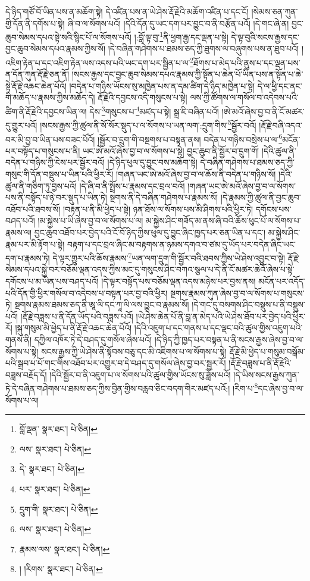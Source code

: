 དེ་ཉིད་གཙོ་བོ་ཡིན་པས་ན་མཆོག་སྟེ། དེ་འཛིན་པས་ན་ཡེ་ཤེས་རྡོ་རྗེའི་མཆོག་འཛིན་པ་དང་ངོ། །སེམས་ཅན་ཀུན་གྱི་དོན་ནི་དགོས་པ་སྟེ། ཞི་བ་ལ་སོགས་པའོ། །དེའི་དོན་དུ་ཡང་དག་པར་བྱུང་བ་ནི་བརྩོན་པའོ། །དེ་གང་ཞེ་ན། བྱང་ཆུབ་སེམས་དཔའ་སྟེ་སའི་སྙིང་པོ་ལ་སོགས་པའོ། །:བློ་ལྟ་བུ་\footnote{བློ་ལྡན་  སྣར་ཐང་།  པེ་ཅིན། }ནི་ཕྱག་རྒྱ་དང་ལྡན་པ་སྟེ། དེ་ལྟ་བུའི་སངས་རྒྱས་དང་བྱང་ཆུབ་སེམས་དཔའ་རྣམས་ཀྱིས་སོ། །དེ་བཞིན་གཤེགས་པ་ཐམས་ཅད་ཀྱི་ཐུགས་ལ་བཞུགས་པས་ན་ཐུབ་པའོ། །འཇིག་རྟེན་པ་དང་འཇིག་རྟེན་ལས་འདས་པའི་ཡང་དག་པར་སྦྱིན་པ་ལ་\footnote{ལས་  སྣར་ཐང་།  པེ་ཅིན། }ཐོགས་པ་མེད་པའི་ནུས་པ་དང་ལྡན་པས་ན་དོན་ཀུན་རྡོ་རྗེ་ཅན་ནོ། །སངས་རྒྱས་དང་བྱང་ཆུབ་སེམས་དཔའ་རྣམས་ཀྱི་སྟོན་པ་ཆེན་པོ་ཡིན་པས་ན་སྟོན་པ་ཆེ་སྟེ་རྡོ་རྗེ་འཆང་ཆེན་པོའོ། །བདེན་པ་གཉིས་ཡོངས་སུ་མཁྱེན་པས་ན་དམ་ཚིག་དེ་ཉིད་མཁྱེན་པ་སྟེ། དེ་ལ་ཕྱི་དང་ནང་གི་མཆོད་པ་རྣམས་ཀྱིས་མཆོད་དེ། རྡོ་རྗེའི་དབྱངས་འདི་གསུངས་པ་སྟེ། ལས་ཀྱི་ཚོགས་ལ་གསོལ་བ་འདེབས་པའི་ཚིག་ནི་རྡོ་རྗེའི་དབྱངས་ཡིན་ལ། དེས་\footnote{དེ་  སྣར་ཐང་།  པེ་ཅིན། }གསུངས་པ་\footnote{པར་  སྣར་ཐང་།  པེ་ཅིན། }མཛད་པ་སྟེ། སྒྲ་ཇི་བཞིན་པའོ། །ཨེ་མའོ་ཞེས་བྱ་བ་ནི་ངོ་མཚར་དུ་གྱུར་པའོ། །སངས་རྒྱས་ཀྱི་ཚུལ་ནི་སོ་སོར་སྡུད་པ་ལ་སོགས་པ་ཡན་ལག་:དྲུག་གིས་\footnote{དྲུག་གི་  སྣར་ཐང་།  པེ་ཅིན། }སྦྱོར་བའོ། །རྡོ་རྗེ་བཞི་འདའ་བར་མི་བྱ་བ་ཡིན་པས་བཟང་པོའོ། །སྦྱོར་བ་དྲུག་གི་བསྔགས་པ་བསྟན་ནས། བདེན་པ་གཉིས་བསྲེས་པ་ལ་\footnote{ལས་  སྣར་ཐང་།  པེ་ཅིན། }མངོན་པར་བསྟོད་པ་གསུངས་པ་ནི། ཡང་ཨེ་མའོ་ཞེས་བྱ་བ་ལ་སོགས་པ་སྟེ། བྱང་ཆུབ་ནི་སྦྱོར་བ་དྲུག་གོ། །དེའི་ཚུལ་ནི་བདེན་པ་གཉིས་ཀྱི་ངེས་པར་སྦྱོར་བའོ། །དེ་ཉིད་ཕུལ་དུ་བྱུང་བས་མཆོག་སྟེ། དེ་བཞིན་གཤེགས་པ་ཐམས་ཅད་ཀྱི་གསུང་གི་དོན་བསྡུས་པ་ཡིན་པའི་ཕྱིར་རོ། །གཞན་ཡང་ཨེ་མའོ་ཞེས་བྱ་བ་ལ་ཆོས་ནི་བདེན་པ་གཉིས་སོ། །དེའི་ཚུལ་ནི་གཅིག་ཏུ་བྱས་པའོ། །དེ་ཞི་བ་ནི་སྤྲོས་པ་རྣམས་དང་བྲལ་བའོ། །གཞན་ཡང་ཨེ་མའོ་ཞེས་བྱ་བ་ལ་སོགས་པས་ནི་བསྟོད་པ་ཉེ་བར་སྡུད་པ་ཡིན་ཏེ། སྔགས་ནི་དེ་བཞིན་གཤེགས་པ་རྣམས་སོ། །དེ་རྣམས་ཀྱི་ཚུལ་ནི་བྱང་ཆུབ་འཐོབ་པའི་ཐབས་སོ། །བརྟན་པ་ནི་མི་ཕྱེད་པ་སྟེ། ཉན་ཐོས་ལ་སོགས་པས་མི་ཤིགས་པའི་ཕྱིར་ཏེ། དགོངས་པས་བཤད་པའོ། །མ་སྐྱེས་པ་ཡི་ཞེས་བྱ་བ་ལ་སོགས་པ་ལ། མ་སྐྱེས་ཤིང་གཟོད་མ་ནས་ཞི་བའི་ཆོས་ཕུང་པོ་ལ་སོགས་པ་རྣམས་ལ། བྱང་ཆུབ་འཐོབ་པར་བྱེད་པའི་ངོ་བོ་ཉིད་ཀྱིས་ཕུལ་དུ་བྱུང་ཞིང་ཁྱད་པར་ཅན་ཡིན་པ་དང་། མ་སྐྱེས་ཤིང་རྣམ་པར་མི་རྟོག་པ་སྟེ། བརྟག་པ་དང་བྲལ་ཞིང་མ་བརྟགས་ན་ཉམས་དགའ་བ་ཙམ་དུ་ཡོད་པར་བདེན་ཞིང་ཡང་དག་པ་རྣམས་ཏེ། དེ་ལྟར་གྱུར་པའི་ཆོས་རྣམས་\footnote{རྣམས་ལས་  སྣར་ཐང་།  པེ་ཅིན། }ཡན་ལག་དྲུག་གི་སྦྱོར་བའི་ཐབས་ཀྱིས་ཡེ་ཤེས་འབྱུང་བ་སྟེ། རྡོ་རྗེ་སེམས་དཔའ་སྐྱེ་བར་བཅོམ་ལྡན་འདས་ཀྱིས་མང་དུ་གསུངས་ཤིང་བཀའ་སྩལ་པ་དེ་ནི་ངོ་མཚར་ཆེའོ་ཞེས་པ་སྟེ་དགོངས་པ་མ་ཡིན་པས་བཤད་པའོ། །དེ་ལྟར་བསྟོད་པས་བཅོམ་ལྡན་འདས་མཉེས་པར་བྱས་ནས། མངོན་པར་འདོད་པའི་དོན་གྱི་ཕྱིར་གསོལ་བ་འདེབས་པ་བསྟན་པར་བྱ་བའི་ཕྱིར། སྔགས་རྣམས་ཀུན་ཞེས་བྱ་བ་ལ་སོགས་པ་གསུངས་ཏེ། སྔགས་རྣམས་ཐམས་ཅད་ནི་ཨཱ་ལི་དང་ཀཱ་ལི་ལས་བྱུང་བ་རྣམས་སོ། །དེ་གང་དུ་བསགས་ཤིང་བསྡུས་པ་ནི་བསྡུས་པའོ། །རྡོ་རྗེ་བཟླས་པ་ནི་དོན་ཡོད་པའི་བཟླས་པའོ། །ཡེ་ཤེས་ཆེན་པོ་ནི་བླ་ན་མེད་པའི་ཡེ་ཤེས་ཐོབ་པར་བྱེད་པའི་ཕྱིར་རོ། །སྐུ་གསུམ་མི་ཕྱེད་པ་ནི་རྡོ་རྗེ་འཆང་ཆེན་པོའོ། །དེའི་འཇུག་པ་དང་གནས་པ་དང་ལྡང་བའི་ཚུལ་གྱིས་འཇུག་པའི་གནས་ནི། དཀྱིལ་འཁོར་ཏེ་དེ་བཤད་དུ་གསོལ་ཞེས་པའོ། །དེ་ཉིད་ཀྱི་ཁྱད་པར་བསྟན་པ་ནི་སངས་རྒྱས་ཞེས་བྱ་བ་ལ་སོགས་པ་སྟེ། སངས་རྒྱས་ཀྱི་ཡེ་ཤེས་ནི་སྟོབས་བཅུ་དང་མི་འཇིགས་པ་ལ་སོགས་པ་སྟེ། རྡོ་རྗེ་མི་ཕྱེད་པ་གསུམ་བསྒོམ་པའི་སྒྲབ་པ་པོ་གང་གིས་འཐོབ་པར་འགྱུར་བ་དེ་བཤད་དུ་གསོལ་ཞེས་བྱ་བར་སྦྱར་རོ། །རྡོ་རྗེ་བཟླས་པ་ནི་རྡོ་རྗེའི་བཟླས་བརྗོད་དོ། །དེའི་སྦྱོར་བ་ནི་འཇུག་པ་ལ་སོགས་པའི་ཚུལ་གྱིས་ཡོངས་སུ་ཟློས་པའོ། །དེ་ཡིས་སངས་རྒྱས་ཀུན་ཏེ་དེ་བཞིན་གཤེགས་པ་ཐམས་ཅད་ཀྱིས་བྱིན་གྱིས་བརླབ་ཅིང་བདག་གིར་མཛད་པའོ:། །རིག་པ་\footnote{། །རིགས་  སྣར་ཐང་།  པེ་ཅིན། }དང་ཞེས་བྱ་བ་ལ་སོགས་པ་ལ། 